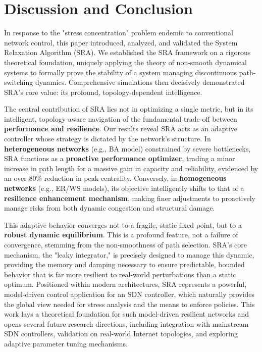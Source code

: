 \documentclass[journal]{IEEEtran}
\begin{document}
\section{Discussion and Conclusion}
\label{sec:discussion_conclusion}

In response to the "stress concentration" problem endemic to conventional network control, this paper introduced, analyzed, and validated the System Relaxation Algorithm (SRA). We established the SRA framework on a rigorous theoretical foundation, uniquely applying the theory of non-smooth dynamical systems to formally prove the stability of a system managing discontinuous path-switching dynamics. Comprehensive simulations then decisively demonstrated SRA's core value: its profound, topology-dependent intelligence.

The central contribution of SRA lies not in optimizing a single metric, but in its intelligent, topology-aware navigation of the fundamental trade-off between \textbf{performance and resilience}. Our results reveal SRA acts as an adaptive controller whose strategy is dictated by the network's structure. In \textbf{heterogeneous networks} (e.g., BA model) constrained by severe bottlenecks, SRA functions as a \textbf{proactive performance optimizer}, trading a minor increase in path length for a massive gain in capacity and reliability, evidenced by an over 80\% reduction in peak centrality. Conversely, in \textbf{homogeneous networks} (e.g., ER/WS models), its objective intelligently shifts to that of a \textbf{resilience enhancement mechanism}, making finer adjustments to proactively manage risks from both dynamic congestion and structural damage.

This adaptive behavior converges not to a fragile, static fixed point, but to a \textbf{robust dynamic equilibrium}. This is a profound feature, not a failure of convergence, stemming from the non-smoothness of path selection. SRA's core mechanism, the "leaky integrator," is precisely designed to manage this dynamic, providing the memory and damping necessary to ensure predictable, bounded behavior that is far more resilient to real-world perturbations than a static optimum. Positioned within modern architectures, SRA represents a powerful, model-driven control application for an SDN controller, which naturally provides the global view needed for stress analysis and the means to enforce policies. This work lays a theoretical foundation for such model-driven resilient networks and opens several future research directions, including integration with mainstream SDN controllers, validation on real-world Internet topologies, and exploring adaptive parameter tuning mechanisms.
\end{document}
